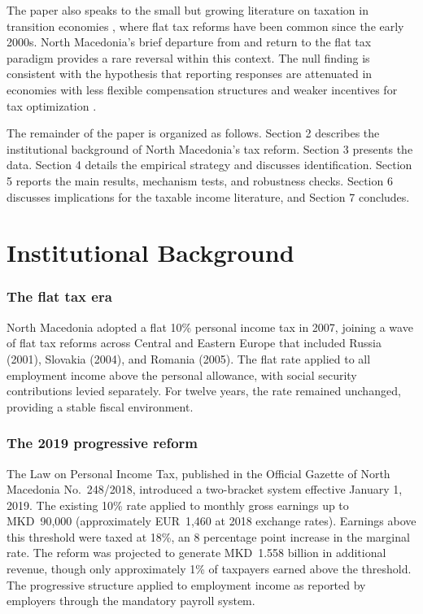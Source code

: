 \documentclass[12pt]{article}
\begin{document}
The paper also speaks to the small but growing literature on taxation in transition economies \citep{gorodnichenko2009myth, ivanova2005income}, where flat tax reforms have been common since the early 2000s. North Macedonia's brief departure from and return to the flat tax paradigm provides a rare reversal within this context. The null finding is consistent with the hypothesis that reporting responses are attenuated in economies with less flexible compensation structures and weaker incentives for tax optimization \citep{kleven2011unwilling}.

The remainder of the paper is organized as follows. Section 2 describes the institutional background of North Macedonia's tax reform. Section 3 presents the data. Section 4 details the empirical strategy and discusses identification. Section 5 reports the main results, mechanism tests, and robustness checks. Section 6 discusses implications for the taxable income literature, and Section 7 concludes.

\section{Institutional Background}

\subsubsection*{The flat tax era} North Macedonia adopted a flat 10\% personal income tax in 2007, joining a wave of flat tax reforms across Central and Eastern Europe that included Russia (2001), Slovakia (2004), and Romania (2005). The flat rate applied to all employment income above the personal allowance, with social security contributions levied separately. For twelve years, the rate remained unchanged, providing a stable fiscal environment.

\subsubsection*{The 2019 progressive reform} The Law on Personal Income Tax, published in the Official Gazette of North Macedonia No.~248/2018, introduced a two-bracket system effective January 1, 2019. The existing 10\% rate applied to monthly gross earnings up to MKD~90,000 (approximately EUR~1,460 at 2018 exchange rates). Earnings above this threshold were taxed at 18\%, an 8 percentage point increase in the marginal rate. The reform was projected to generate MKD~1.558 billion in additional revenue, though only approximately 1\% of taxpayers earned above the threshold. The progressive structure applied to employment income as reported by employers through the mandatory payroll system.
\end{document}
